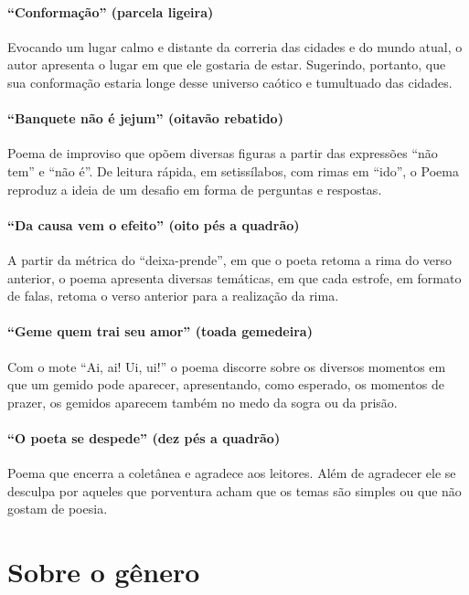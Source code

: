 \paragraph{``Conformação'' (parcela ligeira)}

Evocando um lugar calmo e distante da correria das cidades e do mundo
atual, o autor apresenta o lugar em que ele gostaria de estar.
Sugerindo, portanto, que sua conformação estaria longe desse universo
caótico e tumultuado das cidades.

\paragraph{``Banquete não é jejum'' (oitavão rebatido)}

Poema de improviso que opõem diversas figuras a partir das expressões
``não tem'' e ``não é''. De leitura rápida, em
setissílabos, com rimas em ``ido'', o Poema reproduz 
a ideia de um desafio em forma de perguntas e respostas.

\paragraph{``Da causa vem o efeito'' (oito pés a quadrão)}

A partir da métrica do ``deixa-prende'', em que o poeta
retoma a rima do verso anterior, o poema apresenta diversas temáticas,
em que cada estrofe, em formato de falas, retoma o verso anterior para a
realização da rima.

\paragraph{``Geme quem trai seu amor'' (toada gemedeira)}

Com o mote ``Ai, ai! Ui, ui!'' o
poema discorre sobre os diversos momentos em que um gemido pode
aparecer, apresentando, como esperado, os momentos de prazer, os gemidos
aparecem também no medo da sogra ou da prisão.

\paragraph{``O poeta se despede'' (dez pés a quadrão)}

Poema que encerra a coletânea e agradece aos leitores. 
Além de agradecer ele se desculpa por aqueles que porventura 
acham que os temas são simples ou que não gostam de poesia.

\section{Sobre o gênero} 

